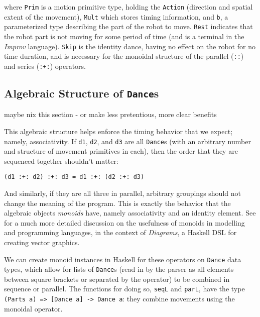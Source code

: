 \documentclass[sigconf]{acmart}
\begin{document}
where \texttt{Prim} is a motion primitive type, holding the
\texttt{Action} (direction and spatial extent of the movement),
\texttt{Mult} which stores timing information, and \texttt{b}, a parameterized type describing the
part of the robot to move. \texttt{Rest} indicates that the robot part
is not moving for some period of time (and is a terminal in the
\emph{Improv} language). \texttt{Skip} is the identity dance, having no
effect on the robot for no time duration, and is necessary for the
monoidal structure of the parallel (\texttt{:\textbar{}\textbar{}:}) and
series (\texttt{:+:}) operators.

\subsection{\texorpdfstring{Algebraic Structure of
\texttt{Dance}s}{Algebraic Structure of Dances}}\label{algebraic-structure-of-dances}

{\color{red} maybe nix this section - or make less pretentious, more clear
benefits}

This algebraic structure helps enforce the timing behavior that we
expect; namely, associativity. If \texttt{d1}, \texttt{d2}, and
\texttt{d3} are all \texttt{Dance}s (with an arbitrary number and
structure of movement primitives in each), then the order that they are
sequenced together shouldn't matter:

\begin{verbatim}
(d1 :+: d2) :+: d3 = d1 :+: (d2 :+: d3)
\end{verbatim}

And similarly, if they are all three in parallel, arbitrary groupings
should not change the meaning of the program. This is exactly the
behavior that the algebraic objects \emph{monoids} have, namely
associativity and an identity element. See \cite{yorgey2012monoids} for a much more
detailed discussion on the usefulness of monoids in modelling and
programming languages, in the context of \emph{Diagrams}, a Haskell DSL
for creating vector graphics.

We can create monoid instances in Haskell for these operators on
\texttt{Dance} data types, which allow for lists of \texttt{Dance}s
(read in by the parser as all elements between square brackets or
separated by the \texttt{\textbar{}\textbar{}} operator) to be combined
in sequence or parallel. The functions for doing so, \texttt{seqL} and
\texttt{parL}, have the type
\texttt{(Parts\ a)\ =\textgreater{}\ {[}Dance\ a{]}\ -\textgreater{}\ Dance\ a}:
they combine movements using the monoidal operator.
\end{document}
